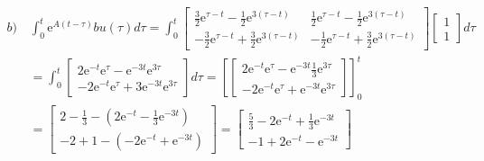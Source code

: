 $$
\begin{aligned}
    b)\,
    & \int_0^t \mathrm{e}^{A(t-\tau)} b u(\tau) d \tau=\int_0^t\left[\begin{array}{ll}
    \frac{3}{2} \mathrm{e}^{\tau-t}-\frac{1}{2} \mathrm{e}^{3(\tau-t)} & \frac{1}{2} \mathrm{e}^{\tau-t}-\frac{1}{2} \mathrm{e}^{3(\tau-t)} \\
    -\frac{3}{2} \mathrm{e}^{\tau-t}+\frac{3}{2} \mathrm{e}^{3(\tau-t)} & -\frac{1}{2} \mathrm{e}^{\tau-t}+\frac{3}{2} \mathrm{e}^{3(\tau-t)}
    \end{array}\right]\left[\begin{array}{l}
    1 \\
    1
    \end{array}\right] d \tau \\
    & =\int_0^t\left[\begin{array}{c}
    2 \mathrm{e}^{-t} \mathrm{e}^\tau-\mathrm{e}^{-3 t} \mathrm{e}^{3 \tau} \\
    -2 \mathrm{e}^{-t} \mathrm{e}^\tau+3 \mathrm{e}^{-3 t} \mathrm{e}^{3 \tau}
    \end{array}\right] d \tau=\left[\left[\begin{array}{c}
    2 \mathrm{e}^{-t} \mathrm{e}^\tau-\mathrm{e}^{-3 t} \frac{1}{3} \mathrm{e}^{3 \tau} \\
    -2 \mathrm{e}^{-t} \mathrm{e}^\tau+\mathrm{e}^{-3 t} \mathrm{e}^{3 \tau}
    \end{array}\right]\right]_0^t \\
    & =\left[\begin{array}{c}
    2-\frac{1}{3}-\left(2 \mathrm{e}^{-t}-\frac{1}{3} \mathrm{e}^{-3 t}\right) \\
    -2+1-\left(-2 \mathrm{e}^{-t}+\mathrm{e}^{-3 t}\right)
    \end{array}\right]=\left[\begin{array}{c}
    \frac{5}{3}-2 \mathrm{e}^{-t}+\frac{1}{3} \mathrm{e}^{-3 t} \\
    -1+2 \mathrm{e}^{-t}-\mathrm{e}^{-3 t}
    \end{array}\right]
    \end{aligned}
$$
